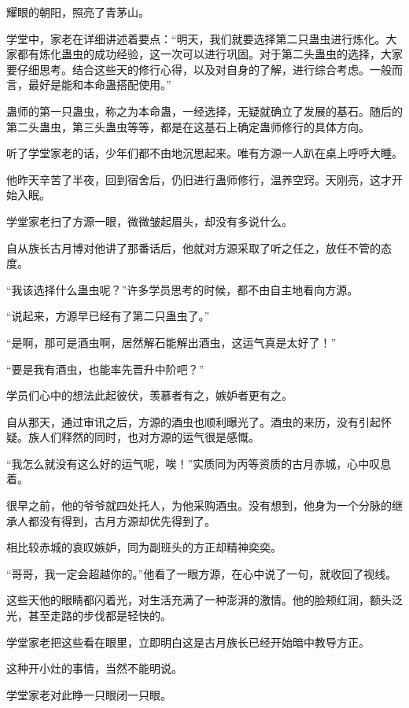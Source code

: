 
\begin{this_body}

耀眼的朝阳，照亮了青茅山。

学堂中，家老在详细讲述着要点：“明天，我们就要选择第二只蛊虫进行炼化。大家都有炼化蛊虫的成功经验，这一次可以进行巩固。对于第二头蛊虫的选择，大家要仔细思考。结合这些天的修行心得，以及对自身的了解，进行综合考虑。一般而言，最好是能和本命蛊搭配使用。”

蛊师的第一只蛊虫，称之为本命蛊，一经选择，无疑就确立了发展的基石。随后的第二头蛊虫，第三头蛊虫等等，都是在这基石上确定蛊师修行的具体方向。

听了学堂家老的话，少年们都不由地沉思起来。唯有方源一人趴在桌上呼呼大睡。

他昨天辛苦了半夜，回到宿舍后，仍旧进行蛊师修行，温养空窍。天刚亮，这才开始入眠。

学堂家老扫了方源一眼，微微皱起眉头，却没有多说什么。

自从族长古月博对他讲了那番话后，他就对方源采取了听之任之，放任不管的态度。

“我该选择什么蛊虫呢？”许多学员思考的时候，都不由自主地看向方源。

“说起来，方源早已经有了第二只蛊虫了。”

“是啊，那可是酒虫啊，居然解石能解出酒虫，这运气真是太好了！”

“要是我有酒虫，也能率先晋升中阶吧？”

学员们心中的想法此起彼伏，羡慕者有之，嫉妒者更有之。

自从那天，通过审讯之后，方源的酒虫也顺利曝光了。酒虫的来历，没有引起怀疑。族人们释然的同时，也对方源的运气很是感慨。

“我怎么就没有这么好的运气呢，唉！”实质同为丙等资质的古月赤城，心中叹息着。

很早之前，他的爷爷就四处托人，为他采购酒虫。没有想到，他身为一个分脉的继承人都没有得到，古月方源却优先得到了。

相比较赤城的哀叹嫉妒，同为副班头的方正却精神奕奕。

“哥哥，我一定会超越你的。”他看了一眼方源，在心中说了一句，就收回了视线。

这些天他的眼睛都闪着光，对生活充满了一种澎湃的激情。他的脸颊红润，额头泛光，甚至走路的步伐都是轻快的。

学堂家老把这些看在眼里，立即明白这是古月族长已经开始暗中教导方正。

这种开小灶的事情，当然不能明说。

学堂家老对此睁一只眼闭一只眼。


\end{this_body}
